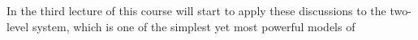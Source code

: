 In the third lecture of this course will start to apply these discussions to the two-level system, which is one of the simplest yet most powerful models of 